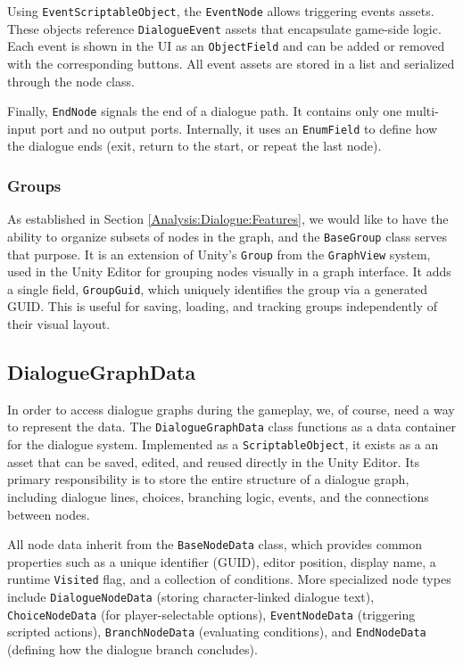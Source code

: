 Using \verb|EventScriptableObject|, the \verb|EventNode| allows triggering events assets. These objects reference \verb|DialogueEvent| assets that encapsulate game-side logic. Each event is shown in the UI as an \verb|ObjectField| and can be added or removed with the corresponding buttons. All event assets are stored in a list and serialized through the node class.

Finally, \verb|EndNode| signals the end of a dialogue path. It contains only one multi-input port and no output ports. Internally, it uses an \verb|EnumField| to define how the dialogue ends (exit, return to the start, or repeat the last node). 
 

\subsubsection{Groups}
As established in Section \ref{Analysis:Dialogue:Features}, we would like to have the ability to organize subsets of nodes in the graph, and the \verb|BaseGroup| class serves that purpose. It is an extension of Unity’s \verb|Group| from the \verb|GraphView| system, used in the Unity Editor for grouping nodes visually in a graph interface. It adds a single field, \verb|GroupGuid|, which uniquely identifies the group via a generated GUID. This is useful for saving, loading, and tracking groups independently of their visual layout.


\subsection{DialogueGraphData}
\label{devlog:DialogueGraphData}
In order to access dialogue graphs during the gameplay, we, of course, need a way to represent the data. The \verb|DialogueGraphData| class functions as a data container for the dialogue system. Implemented as a \verb|ScriptableObject|, it exists as a an asset that can be saved, edited, and reused directly in the Unity Editor. Its primary responsibility is to store the entire structure of a dialogue graph, including dialogue lines, choices, branching logic, events, and the connections between nodes.

All node data inherit from the \verb|BaseNodeData| class, which provides common properties such as a unique identifier (GUID), editor position, display name, a runtime \verb|Visited| flag, and a collection of conditions. More specialized node types include \verb|DialogueNodeData| (storing character-linked dialogue text), \verb|ChoiceNodeData| (for player-selectable options), \verb|EventNodeData| (triggering scripted actions), \verb|BranchNodeData| (evaluating conditions), and \verb|EndNodeData| (defining how the dialogue branch concludes).

